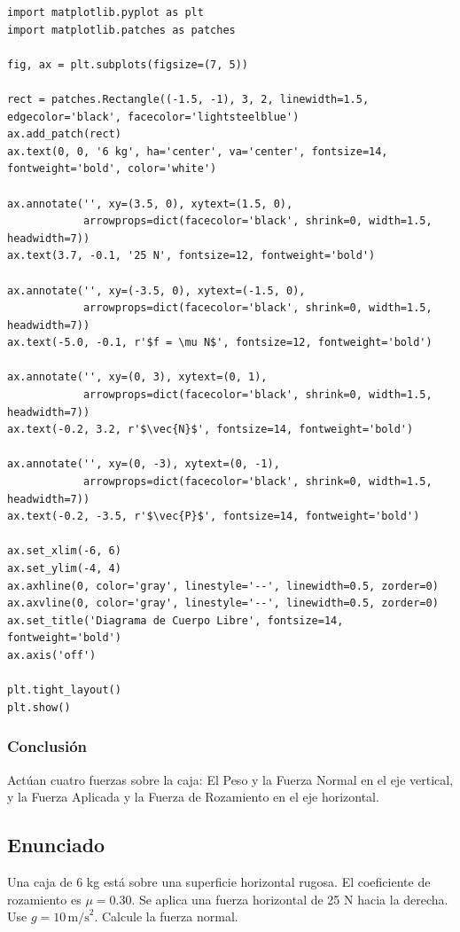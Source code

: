\documentclass[12pt]{article}
\begin{document}
\begin{lstlisting}
import matplotlib.pyplot as plt
import matplotlib.patches as patches

fig, ax = plt.subplots(figsize=(7, 5))

rect = patches.Rectangle((-1.5, -1), 3, 2, linewidth=1.5, edgecolor='black', facecolor='lightsteelblue')
ax.add_patch(rect)
ax.text(0, 0, '6 kg', ha='center', va='center', fontsize=14, fontweight='bold', color='white')

ax.annotate('', xy=(3.5, 0), xytext=(1.5, 0), 
            arrowprops=dict(facecolor='black', shrink=0, width=1.5, headwidth=7))
ax.text(3.7, -0.1, '25 N', fontsize=12, fontweight='bold')

ax.annotate('', xy=(-3.5, 0), xytext=(-1.5, 0), 
            arrowprops=dict(facecolor='black', shrink=0, width=1.5, headwidth=7))
ax.text(-5.0, -0.1, r'$f = \mu N$', fontsize=12, fontweight='bold')

ax.annotate('', xy=(0, 3), xytext=(0, 1), 
            arrowprops=dict(facecolor='black', shrink=0, width=1.5, headwidth=7))
ax.text(-0.2, 3.2, r'$\vec{N}$', fontsize=14, fontweight='bold')

ax.annotate('', xy=(0, -3), xytext=(0, -1), 
            arrowprops=dict(facecolor='black', shrink=0, width=1.5, headwidth=7))
ax.text(-0.2, -3.5, r'$\vec{P}$', fontsize=14, fontweight='bold')

ax.set_xlim(-6, 6)
ax.set_ylim(-4, 4)
ax.axhline(0, color='gray', linestyle='--', linewidth=0.5, zorder=0)
ax.axvline(0, color='gray', linestyle='--', linewidth=0.5, zorder=0)
ax.set_title('Diagrama de Cuerpo Libre', fontsize=14, fontweight='bold')
ax.axis('off')

plt.tight_layout()
plt.show()
\end{lstlisting}

\subsubsection*{Conclusión}
Actúan cuatro fuerzas sobre la caja: El Peso y la Fuerza Normal en el eje vertical, y la Fuerza Aplicada y la Fuerza de Rozamiento en el eje horizontal.

\newpage

\subsection*{Enunciado}
Una caja de 6 kg está sobre una superficie horizontal rugosa. El coeficiente de rozamiento es $\mu = 0.30$. Se aplica una fuerza horizontal de 25 N hacia la derecha. Use $g = 10 \, \text{m/s}^2$. Calcule la fuerza normal.
\end{document}
